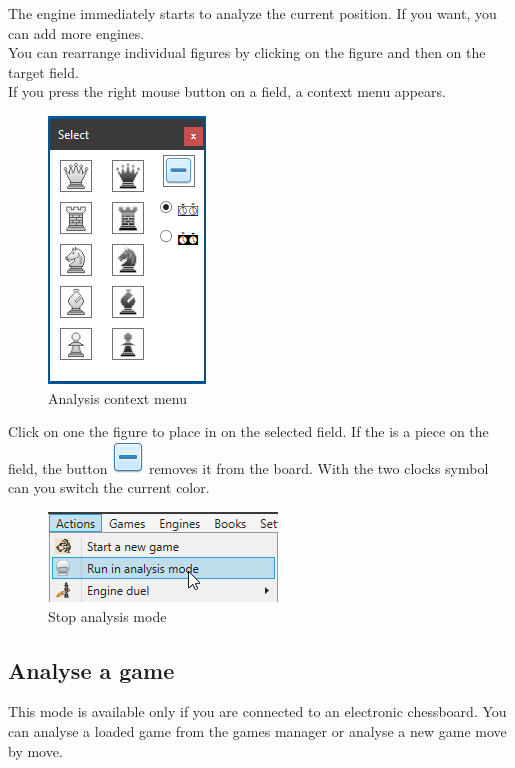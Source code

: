 \documentclass[11pt,a4paper]{article}
\begin{document}
The engine immediately starts to analyze the current position. If you want, you can add more engines.\\
You can rearrange individual figures by clicking on the figure and then on the target field.\\
If you press the right mouse button on a field, a context menu appears.

\begin{figure}[H]
	\centering
	\includegraphics[scale=1.0]{AnalyzeMode4.png}
	\caption{Analysis context menu}
	\label{fig:AnalyzeMode4}
\end{figure}

Click on one the figure to place in on the selected field. If the is a piece on the field, the button \includegraphics[scale=0.3]{toggle.png} removes it from the board. With the two clocks symbol can you switch the current color.

\begin{figure}[H]
	\centering
	\includegraphics[scale=1.0]{AnalyzeMode3.png}
	\caption{Stop analysis mode}
	\label{fig:AnalyzeMode3_2}
\end{figure}

\subsection{Analyse a game} \label{AnalyzeMode2}

This mode is available only if you are connected to an electronic chessboard.
You can analyse a loaded game from the games manager or analyse a new game move by move.
\end{document}
